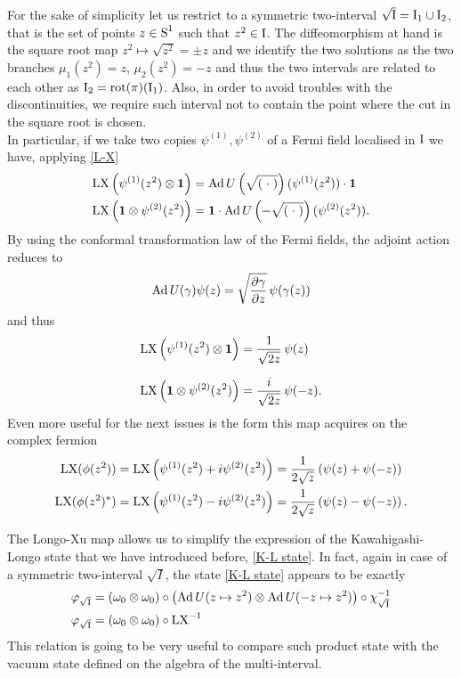  \begin{example}
 For the sake of simplicity let us restrict to a 
 symmetric two-interval $\sqrt{\textrm{I}}=\textrm{I}_1\cup\textrm{I}_2$, 
 that is the
 set of points $z\in\textrm{S}^1$ such that $z^2\in\textrm{I}$. 
 The diffeomorphism at hand is the square root 
 map $z^2\mapsto \sqrt{z^2}=\pm z$ and we identify
 the two solutions as the two branches $\mu_1(z^2)=
 z$, $\mu_2(z^2)=-z$ and thus the two intervals are
 related to each other as $\textrm{I}_2=\operatorname{rot}(\pi)(\textrm{I}_1)$. Also,
 in order to avoid troubles with the discontinuities,
 we require such interval not to contain the point 
 where the cut in the square root is chosen. \\
 
 In particular, if we take two copies $\psi^{(1)},
 \psi^{(2)}$ of a Fermi field localised in $\textrm{I}$ we have,
 applying \eqref{L-X}
 \begin{align*}
 \textrm{LX}\left(\psi^{(1)}(z^2)\otimes\bm{1}\right)&=
 \operatorname{Ad} U\left(\sqrt{(\;{\cdot}\;)}\right)(\psi^{(1)}(z^2))\cdot\bm{1}\\
 \textrm{LX}\left(\bm{1}\otimes\psi^{(2)}(z^2)\right)&=
 \bm{1}\cdot\operatorname{Ad} U\left(-\sqrt{(\;{\cdot}\;)}\right)(\psi^{(2)}(z^2)).\\ 
 \end{align*}
 By using the conformal transformation law of the 
 Fermi fields, the adjoint action reduces to 
 \[
 \operatorname{Ad} U(\gamma)\psi(z)=\sqrt{\frac{\partial\gamma}{\partial z}}
 \,\psi(\gamma(z))
 \] 
 and thus
 \begin{align*}
 \textrm{LX}\left(\psi^{(1)}(z^2)\otimes\bm{1}\right)&=
 \frac{1}{\sqrt{2z}}\,\psi(z)\\[1.5ex]
 \textrm{LX}\left(\bm{1}\otimes\psi^{(2)}(z^2)\right)&=
 \frac{i}{\sqrt{2z}}\,\psi(-z).
 \end{align*}
 Even more useful for the next issues is the form this
 map acquires on the complex fermion 
 \begin{align}
 \textrm{LX}(\phi(z^2))&=\textrm{LX}\left(\psi^{(1)}(z^2)+i\psi^{(2)}(z^2)\right)
 =\frac{1}{2\sqrt{z}}\left(\psi(z)+\psi(-z)\right)
 \label{LX_complex}\\ 
 \textrm{LX}(\phi(z^2)^*)&=\textrm{LX}\left(\psi^{(1)}(z^2)-i\psi^{(2)}(z^2)\right)
 =\frac{1}{2\sqrt{z}}\left(\psi(z)-\psi(-z)\right).
 \end{align}
 \end{example}
 
 \bigskip
 The Longo-Xu map allows us to
 simplify the expression of the Kawahigashi-Longo
 state that we have introduced before, \eqref{K-L state}. 
 In fact, again 
 in case of a symmetric two-interval $\sqrt{I}$, 
 the state \eqref{K-L state} appears to be exactly
 \begin{align*}
 \varphi_{\sqrt{\textrm{I}}}&=\left(\omega_0\otimes\omega_0\right)
 \circ\left(\operatorname{Ad} U(z\mapsto z^2)\otimes\operatorname{Ad} U(-z\mapsto z^2)\right)
 \circ\chi^{-1}_{\sqrt{\textrm{I}}}\\ 
 \varphi_{\sqrt{\textrm{I}}}&=\left(\omega_0\otimes\omega_0\right)\circ
 \textrm{LX}^{-1}
 \end{align*}
 This relation is going to be very useful to compare
 such product state with the vacuum state defined 
 on the algebra of the multi-interval.
 
